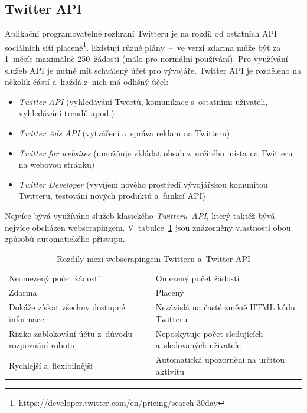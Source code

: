 \subsection*{Twitter API}
Aplikační programovatelné rozhraní Twitteru je na rozdíl od ostatních API sociálních sítí placené\footnote{\href{https://developer.twitter.com/en/pricing/search-30day}{https://developer.twitter.com/en/pricing/search-30day}}. Existují různé plány~--~ve verzi zdarma může být za 1~měsíc maximálně 250~žádostí (málo pro normální používání). Pro využívání služeb API je nutné mít schválený účet pro vývojáře. Twitter API je rozděleno na několik částí a~každá z~nich má odlišný účel:

\begin{itemize}
    \item \textit{Twitter API} (vyhledávání Tweetů, komunikace s~ostatními uživateli, vyhledávání trendů apod.)
    \item \textit{Twitter Ads API} (vytváření a~správa reklam na Twitteru)
    \item \textit{Twitter for websites} (umožňuje vkládat obsah z~určitého místa na Twitteru na webovou stránku)
    \item \textit{Twitter Developer} (vyvíjení nového prostředí vývojářskou komunitou Twitteru, testování nových produktů a~funkcí API)
\end{itemize}

\noindent
Nejvíce bývá využíváno služeb klasického \textit{Twitteru~API}, který taktéž bývá nejvíce obcházen webscrapingem. V~tabulce~\ref{tab:Twitter_API_vs_webscraping} jsou znázorněny vlastnosti obou způsobů automatického přístupu.

\begin{table}[H]
\begin{tabularx}{\linewidth}{
    |>{\hsize=1\hsize}X|>{\hsize=1\hsize}X|
  }
\hline

\multicolumn{1}{|c|}{\textbf{Webscraping}} & \multicolumn{1}{|c|}{\textbf{Twitter API}} \\
\hline
Neomezený počet žádostí & Omezený počet žádostí \\
\hline
Zdarma & Placený \\
\hline
Dokáže získat všechny dostupné informace & Nezávislá na časté změně HTML kódu Twitteru \\
\hline
Riziko zablokování účtu z~důvodu rozpoznání robota & Neposkytuje počet sledujících a~sledovaných uživatele~\cite{bib:Twitter_followings}\\ \hline
Rychlejší a~flexibilnější~\cite{bib:Twitter_followings} & Automatická upozornění na určitou aktivitu \\
\hline
\end{tabularx}

\label{tab:Twitter_API_vs_webscraping}
\caption{Rozdíly mezi webscrapingem Twitteru a~Twitter API}
\end{table}

